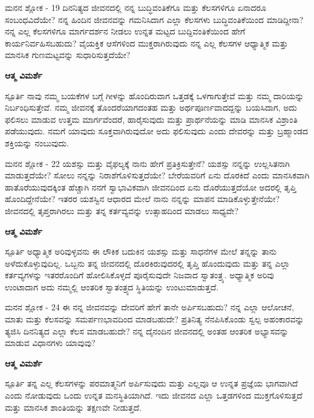 \newpage
\begin{mananam}{\mananamfont ಮನನ ಶ್ಲೋಕ - \textenglish{19}}
\footnotesize \mananamtext ದಿನನಿತ್ಯದ ಜೀವನದಲ್ಲಿ ನನ್ನ ಬುದ್ಧಿವಂತಿಕೆಗೂ ಮತ್ತು ಕೆಲಸಗಳಿಗೂ ಏನಾದರೂ ಸಂಬಂಧವಿದೆಯೇ? ನನ್ನ ಹಿಂದಿನ ಜೀವನವನ್ನು ಗಮನಿಸಿದಾಗ ಎಲ್ಲಾ ಕೆಲಸಗಳು ಬುದ್ಧಿವಂತಿಕೆಯಿಂದ ಮಾಡಿದ್ದೀನಾ? ನನ್ನ ಎಲ್ಲ ಕೆಲಸಗಳಿಗೂ ಮಾರ್ಗದರ್ಶನ ನೀಡಲು ಉನ್ನತ ಮಟ್ಟದ ಬುದ್ದಿವಂತಿಕೆಯಿಂದ ಹೇಗೆ ಕಾರ್ಯನಿರ್ವಹಿಸಬಹುದು? ವೈಯಕ್ತಿಕ ಆಸೆಗಳಿಂದ ಮುಕ್ತರಾಗಿರುವುದು ನನ್ನ ಎಲ್ಲ ಕೆಲಸಗಳ ಆಧ್ಯಾತ್ಮಿಕ ಮತ್ತು ಮಾನಸಿಕ ಗುಣಮಟ್ಟವನ್ನು ಸುಧಾರಿಸುತ್ತದೆಯೇ?
\end{mananam}
\WritingHand\enspace\textbf{ಆತ್ಮ ವಿಮರ್ಶೆ}\\
\begin{inspiration}{\mananamfont ಸ್ಪೂರ್ತಿ}
\footnotesize \mananamtext ನಾವು ನಮ್ಮ ಬಯಕೆಗಳ ಬಗ್ಗೆ ಗೀಳನ್ನು ಹೊಂದಿರುವಾಗ ಒತ್ತಡಕ್ಕೆ ಒಳಗಾಗುತ್ತೇವೆ ಮತ್ತು ನಮ್ಮ ದಾರಿಯನ್ನು ನಿರ್ಬಂಧಿಸುತ್ತೇವೆ. ನಮ್ಮ ಜೀವನಕ್ಕೆ ತೊಂದರೆಯಾಗದಂತಹ ಮತ್ತು ಅರ್ಥಪೂರ್ಣವಾದದ್ದನ್ನು ಬಯಸಿದಾಗ, ಅದು ಫಲಿಸಲು ಮಾಡುವ ಉತ್ತಮ ಮಾರ್ಗವೆಂದರೆ, ಹಾರೈಸುವುದು ಮತ್ತು ಪ್ರಾರ್ಥನೆಯನ್ನು ಮಾಡಿ ಮಾನಸಿಕ ವಿಶ್ರಾಂತಿ ಪಡೆಯುವುದು. ನಮಗೆ ಯಾವುದು ಸೂಕ್ತವಾಗಿರುವುದೋ ಅದು ಫಲಿಸುವುದು ಎಂದು ದೇವರನ್ನು ಮತ್ತು ಬ್ರಹ್ಮಾಂಡದ ಶಕ್ತಿಯನ್ನು ನಂಬುವುದು.
\end{inspiration}
\newpage

\begin{mananam}{\mananamfont ಮನನ ಶ್ಲೋಕ - \textenglish{22}}
\footnotesize \mananamtext ಯಶಸ್ಸು ಮತ್ತು ವೈಫಲ್ಯಕ್ಕೆ ನಾನು ಹೇಗೆ ಪ್ರತಿಕ್ರಿಸುತ್ತೇನೆ? ಯಶಸ್ಸು ನನ್ನನ್ನು ಉಲ್ಲಸಿತನಾಗಿ ಮಾಡುತ್ತದೆಯೇ? ಸೋಲು ನನ್ನನ್ನು ನಿರಾಶೆಗೊಳಿಸುತ್ತದೆಯೇ? ಬೇರೆಯವರಿಗೆ ಏನು ದೊರಕಿದೆ ಎಂದು ಮಾನಸಿಕವಾಗಿ ಹಾತೊರೆಯುವುದಕ್ಕಿಂತ ಹೆಚ್ಚಾಗಿ ನನಗೆ ಸ್ವಾಭಾವಿಕವಾಗಿ ಜೀವನದಿಂದ ಏನು ದೊರೆಯುತ್ತದೆಯೋ ಅದರಲ್ಲಿ ತೃಪ್ತಿ ಹೊಂದಿದ್ದೇನೆಯೇ? ಇತರರ ಯಶಸ್ವಿನ ಆಧಾರದ ಮೇಲೆ ನಾನು ನನ್ನನ್ನು ಮಾಪನ ಮಾಡಿಕೊಳ್ಳುತ್ತೇನೆಯೇ? ಜೀವನದಲ್ಲಿ ತೃಪ್ತರಾಗಿರಲು ಮತ್ತು ತನ್ನ ಕರ್ತವ್ಯವನ್ನು ಉತ್ಸಾಹದಿಂದ ಮಾಡಲು ಸಾಧ್ಯವೇ?
\end{mananam}
\WritingHand\enspace\textbf{ಆತ್ಮ ವಿಮರ್ಶೆ}\\
\begin{inspiration}{\mananamfont ಸ್ಪೂರ್ತಿ}
\footnotesize \mananamtext ಅಧ್ಯಾತ್ಮಿಕ ಅರಿವುಳ್ಳವನು ಈ ಲೌಕಿಕ ಬದುಕಿನ ಯಶಸ್ಸು ಮತ್ತು ಸಾಧನೆಗಳ ಮೇಲೆ ತನ್ನನ್ನು ತಾನು ಅಳೆದುಕೊಳ್ಳುವುದಿಲ್ಲ. ಒಬ್ಬನು ತನ್ನ ಜೀವನದಲ್ಲಿ ದೊರಕಿರುವುದರಲ್ಲಿ ತೃಪ್ತಿ ಹೊಂದುವುದು ಮತ್ತು ತನ್ನ ಎಲ್ಲಾ ಕರ್ತವ್ಯಗಳನ್ನು ಇತರರೊಂದಿಗೆ ಹೋಲಿಸಿಕೊಳ್ಳದೆ ಪೂರೈಸುವುದೇ ನಿಜವಾದ ಸ್ವಾತಂತ್ರ್ಯ.  ಅಧ್ಯಾತ್ಮಿಕ  ಅರಿವು ಉಂಟಾದಾಗ ಅದು ನಮ್ಮಲ್ಲಿ ಆಂತರಿಕ ಸ್ವಾತಂತ್ರ್ಯದ ಸ್ಥಿತಿಯನ್ನು ಉಂಟುಮಾಡುತ್ತದೆ. 
\end{inspiration}
\newpage

\begin{mananam}{\mananamfont ಮನನ ಶ್ಲೋಕ - \textenglish{24}}
\footnotesize \mananamtext ಈ ನನ್ನ ಜೀವನವನ್ನು ದೇವರಿಗೆ ಹೇಗೆ ತಾನೇ ಅರ್ಪಿಸಬಹುದು? ನನ್ನ ಎಲ್ಲಾ ಆಲೋಚನೆ, ಮಾತು ಮತ್ತು ಕೆಲಸವನ್ನು ಸಮರ್ಪಣಭಾವದಿಂದ ಮಾಡಬಹುದೇ? ಪ್ರತಿನಿತ್ಯ ನೆನಪಿಸಿಕೊಂಡು ಸ್ವಲ್ಪ ಅಹಂಕಾರವನ್ನು ತ್ಯಜಿಸಿ ದಿನನಿತ್ಯದ ಎಲ್ಲಾ ಕೆಲಸ ಮಾಡಬಹುದೇ? ನನ್ನ ದೈನಂದಿನ ಜೀವನದಲ್ಲಿ ಅಂತಹ ಆಂತರಿಕ ಅಭ್ಯಾಸವನ್ನು ಮಾಡುವ ವಿಧಾನಗಳು ಯಾವುವು?
\end{mananam}
\WritingHand\enspace\textbf{ಆತ್ಮ ವಿಮರ್ಶೆ}\\
\begin{inspiration}{\mananamfont ಸ್ಪೂರ್ತಿ}
\footnotesize \mananamtext ತನ್ನ ಎಲ್ಲ ಕೆಲಸಗಳನ್ನು ಪರಮಾತ್ಮನಿಗೆ ಅರ್ಪಿಸುವುದು ಮತ್ತು ಎಲ್ಲವೂ ಆ ಉನ್ನತ ಪ್ರಜ್ಞೆಯ ಭಾಗವಾಗಿದೆ ಎಂದು ನೋಡುವುದು ಒಂದು ಉನ್ನತ ಮನಸ್ಥಿತಿಯಾಗಿದೆ. ಇದು ಜೀವನದ ಎಲ್ಲಾ ಒತ್ತಡಗಳಿಂದ ಮುಕ್ತಗೊಳಿಸುತ್ತದೆ ಮತ್ತು ಮಾನಸಿಕ ಶಾಂತಿಯನ್ನು ತಕ್ಷಣವೇ ನೀಡುತ್ತದೆ.
\end{inspiration}
\newpage


